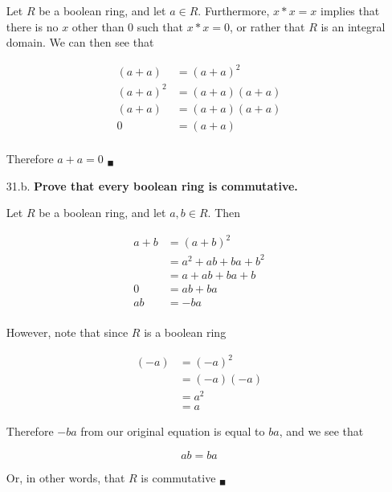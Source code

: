 \documentclass{article}
\begin{document}
\begin{enumerate}
			Let $R$ be a boolean ring, and let $a \in R$. Furthermore, $x * x = x$ implies that 
			there is no $x$ other than 0 such that $x * x = 0$, or rather that $R$ is an integral
			domain. We can then see that

			\begin{align*}
				(a + a) & = (a + a)^2 \\
				(a + a)^2 & = (a + a)(a + a) \\
				(a + a) & = (a + a)(a + a) \\
				0 & = (a + a) \\
			\end{align*}

			Therefore $a + a = 0$ $_{\blacksquare}$

		\item [31.b.] \textbf{Prove that every boolean ring is commutative.}

			Let $R$ be a boolean ring, and let $a, b \in R$. Then

			\begin{align*}
				a + b & = (a + b)^2 \\
				      & = a^2 + ab + ba + b^2 \\
				      & = a + ab + ba + b \\
				0 & = ab + ba \\
				ab & = -ba\\
			\end{align*}

			However, note that since $R$ is a boolean ring

			\begin{align*}
				(-a) & = (-a)^2 \\
					 & = (-a)(-a) \\
					 & = a^2 \\
					 & = a
			\end{align*}

			Therefore $-ba$ from our original equation is equal to $ba$, and we see that 

			\begin{equation*}
				ab = ba
			\end{equation*}

			Or, in other words, that $R$ is commutative $_{\blacksquare}$

	\end{enumerate}
\end{document}
